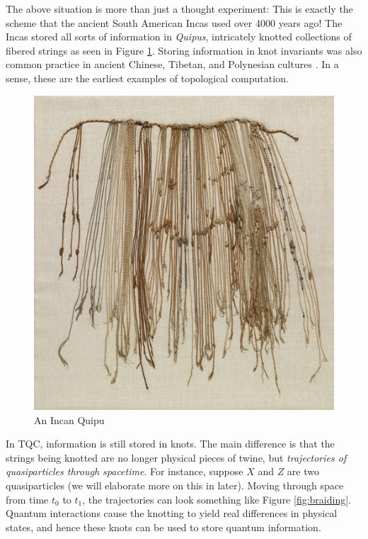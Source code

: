 \documentclass{article}
\theoremstyle{definition}
\numberwithin{figure}{section}
\begin{document}
The above situation is more than just a thought experiment: This is exactly the scheme that the ancient South American Incas used over 4000 years ago! The Incas stored all sorts of information in \textit{Quipus}, intricately knotted collections of fibered strings \cite{ascher1981code} as seen in Figure \ref{fig:quipu}. Storing information in knot invariants was also common practice in ancient Chinese, Tibetan, and Polynesian cultures \cite{day2021quipus}. In a sense, these are the earliest examples of topological computation.

\begin{figure}
\begin{center}
\includegraphics[scale=0.85]{quipu}
\caption{An Incan Quipu}
\label{fig:quipu}
\end{center}
\end{figure}

In TQC, information is still stored in knots. The main difference is that the strings being knotted are no longer physical pieces of twine, but \textit{trajectories of quasiparticles through spacetime}. For instance, suppose $X$ and $Z$ are two quasiparticles (we will elaborate more on this in later). Moving through space from time $t_0$ to $t_1$, the trajectories can look something like Figure \ref{fig:braiding}. Quantum interactions cause the knotting to yield real differences in physical states, and hence these knots can be used to store quantum information.
\end{document}
